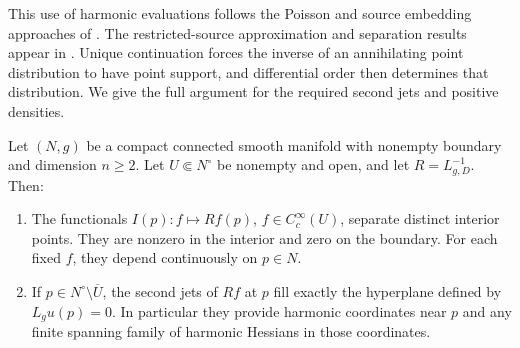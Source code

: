 This use of harmonic evaluations follows the Poisson and source
embedding approaches of \citet[Sections~2 and~6.1]{LLS20}.
The restricted-source approximation and separation results appear in
\citep[Appendix~A, Propositions~A.6--A.7]{LLS20}.
Unique continuation forces the inverse of an annihilating point
distribution to have point support, and differential order then
determines that distribution. We give the full argument for the
required second jets and positive densities.

\begin{lemma}\label{data:jet-family}
Let $(N,g)$ be a compact connected smooth manifold with nonempty
boundary and dimension $n\ge2$. Let $U\Subset N^\circ$ be
nonempty and open, and let $R=L_{g,D}^{-1}$. Then:
\begin{enumerate}[label=\textup{(\roman*)}]
 \item The functionals $I(p):f\mapsto Rf(p)$,
       $f\in C_c^\infty(U)$, separate distinct interior points.
       They are nonzero in the interior and zero on the boundary.
       For each fixed $f$, they depend continuously on $p\in N$.
 \item If $p\in N^\circ\setminus\overline U$, the second jets of
       $Rf$ at $p$ fill exactly the hyperplane defined by
       $L_g u(p)=0$. In particular they provide harmonic coordinates
       near $p$ and any finite spanning family of harmonic Hessians
       in those coordinates.
\end{enumerate}
\end{lemma}

